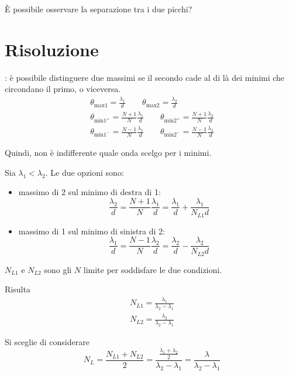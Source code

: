 È possibile osservare la separazione tra i due picchi?

\section{Risoluzione}

: è possibile distinguere due massimi se il secondo cade al di là dei minimi che circondano il primo, o viceversa.
\begin{gather}
    \theta_{\text{max}1} = \frac{\lambda_1}{d}
    \qquad
    \theta_{\text{max}2} = \frac{\lambda_2}{d} \\
    \theta_{\text{min}1^+} = \frac{N+1}{N} \frac{\lambda_1}{d}
    \qquad
    \theta_{\text{min}2^+} = \frac{N+1}{N} \frac{\lambda_2}{d} \\
    \theta_{\text{min}1^-} = \frac{N-1}{N} \frac{\lambda_1}{d}
    \qquad
    \theta_{\text{min}2^-} = \frac{N-1}{N} \frac{\lambda_2}{d}
\end{gather}

Quindi, non è indifferente quale onda scelgo per i minimi.

Sia $\lambda_1 < \lambda_2$.
Le due opzioni sono:
\begin{itemize}
    \item massimo di 2 sul minimo di destra di 1:
    \begin{equation}
        \frac{\lambda_2}{d} = \frac{N+1}{N} \frac{\lambda_1}{d}
        = \frac{\lambda_1}{d} + \frac{\lambda_1}{N_{L1} d}
    \end{equation}
    \item massimo di 1 sul minimo di sinistra di 2:
    \begin{equation}
        \frac{\lambda_1}{d} = \frac{N-1}{N} \frac{\lambda_2}{d}
        = \frac{\lambda_2}{d} - \frac{\lambda_2}{N_{L2} d}
    \end{equation}
\end{itemize}
$N_{L1}$ e $N_{L2}$ sono gli $N$ limite per soddisfare le due condizioni.

Risulta
\begin{subequations}
\begin{gather}
    N_{L1} = \frac{\lambda_1}{\lambda_2 - \lambda_1} \\
    N_{L2} = \frac{\lambda_2}{\lambda_2 - \lambda_1}
\end{gather}
\end{subequations}

Si sceglie di considerare
\begin{equation}
    N_L = \frac{N_{L1} + N_{L2}}{2} = \frac{\frac{\lambda_1 + \lambda_2}{2}}{\lambda_2 - \lambda_1}
    = \frac{\lambda}{\lambda_2 - \lambda_1}
\end{equation}

